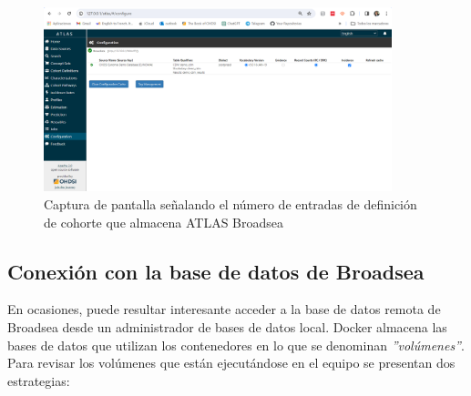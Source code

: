 \documentclass{article}
\begin{document}
\begin{enumerate}
\begin{figure}[H]
    \centering
    \includegraphics[width=0.90\textwidth]{images/atlasBroadseaDB.png}
     \caption{Captura de pantalla señalando el número de entradas de definición de cohorte que almacena ATLAS Broadsea}
    \label{fig:atlasBroadseaDB}
\end{figure}
    
\end{enumerate}

\subsection{Conexión con la base de datos de Broadsea}

En ocasiones, puede resultar interesante acceder a la base de datos remota de Broadsea desde un administrador de bases de datos local.  Docker almacena las bases de datos que utilizan los contenedores en lo que se denominan \textit{''volúmenes''}. Para revisar los volúmenes que están ejecutándose en el equipo se presentan dos estrategias:
\end{document}
